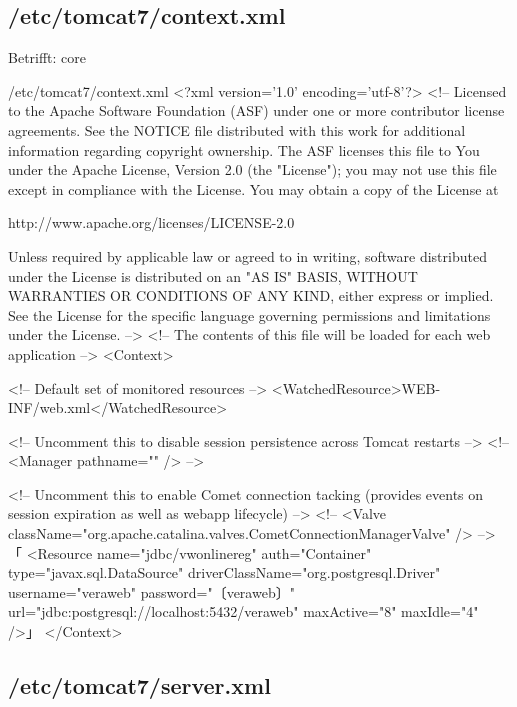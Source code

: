 \fi%

\subsection{/etc/tomcat7/context.xml}\label{subsec:refcfg-tc-ctx}

\ifoa
Betrifft: core
\fi%

\begin{lstdump}{/etc/tomcat7/context.xml}
<?xml version='1.0' encoding='utf-8'?>
<!--
  Licensed to the Apache Software Foundation (ASF) under one or more
  contributor license agreements.  See the NOTICE file distributed with
  this work for additional information regarding copyright ownership.
  The ASF licenses this file to You under the Apache License, Version 2.0
  (the "License"); you may not use this file except in compliance with
  the License.  You may obtain a copy of the License at

      http://www.apache.org/licenses/LICENSE-2.0

  Unless required by applicable law or agreed to in writing, software
  distributed under the License is distributed on an "AS IS" BASIS,
  WITHOUT WARRANTIES OR CONDITIONS OF ANY KIND, either express or implied.
  See the License for the specific language governing permissions and
  limitations under the License.
-->
<!-- The contents of this file will be loaded for each web application -->
<Context>

    <!-- Default set of monitored resources -->
    <WatchedResource>WEB-INF/web.xml</WatchedResource>

    <!-- Uncomment this to disable session persistence across Tomcat restarts -->
    <!--
    <Manager pathname="" />
    -->

    <!-- Uncomment this to enable Comet connection tacking (provides events
         on session expiration as well as webapp lifecycle) -->
    <!--
    <Valve className="org.apache.catalina.valves.CometConnectionManagerValve" />
    -->
「
    <Resource name="jdbc/vwonlinereg" auth="Container" type="javax.sql.DataSource"
     driverClassName="org.postgresql.Driver" username="veraweb" password="〔veraweb〕"
     url="jdbc:postgresql://localhost:5432/veraweb" maxActive="8" maxIdle="4" />」
</Context>\end{lstdump}

\subsection{/etc/tomcat7/server.xml}\label{subsec:refcfg-tc-server}


